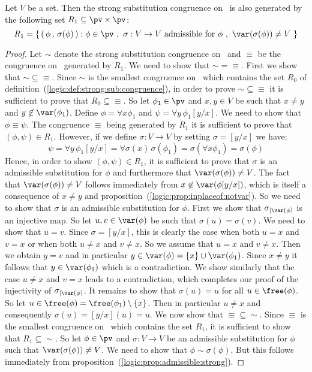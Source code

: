 \begin{prop}\label{logic:prop:strong:quant:congruence:from:admissible}
Let $V$ be a set. Then the strong substitution congruence on \pv\ is
also generated by the following set $R_{1}\subseteq \pv\times\pv$:
    \[
    R_{1}=\left\{\,(\,\phi\,,\,\sigma(\phi)\,):\phi\in\pv\ ,\
    \mbox{$\sigma:V\to V$ admissible for $\phi$}\ ,\
    \var(\sigma(\phi))\neq V\ \right\}
    \]
\end{prop}
\begin{proof}
Let $\sim$ denote the strong substitution congruence on \pv\ and
$\equiv$ be the congruence on \pv\ generated by $R_{1}$. We need to
show that $\sim=\equiv$. First we show that $\sim\subseteq\equiv$.
Since $\sim$ is the smallest congruence on \pv\ which contains the
set $R_{0}$ of definition~(\ref{logic:def:strong:sub:congruence}),
in order to prove $\sim\subseteq\equiv$ it is sufficient to prove
that $R_{0}\subseteq\equiv$. So let $\phi_{1}\in\pv$ and $x,y\in V$
be such that $x\neq y$ and $y\not\in\var(\phi_{1})$. Define
$\phi=\forall x\phi_{1}$ and $\psi=\forall y\,\phi_{1}[y/x]$. We
need to show that $\phi\equiv\psi$. The congruence $\equiv$ being
generated by $R_{1}$ it is sufficient to prove that $(\phi,\psi)\in
R_{1}$. However, if we define $\sigma:V\to V$ by setting
$\sigma=[y/x]$ we have:
    \[
    \psi=\forall
    y\,\phi_{1}[y/x]=\forall\sigma(x)\,\sigma(\phi_{1})=\sigma(\forall
    x\phi_{1})=\sigma(\phi)
    \]
Hence, in order to show $(\phi,\psi)\in R_{1}$, it is sufficient to
prove that $\sigma$ is an admissible substitution for $\phi$ and
furthermore that $\var(\sigma(\phi))\neq V$. The fact that
$\var(\sigma(\phi))\neq V$ follows immediately from
$x\not\in\var(\phi[y/x])$, which is itself a consequence of $x\neq
y$ and proposition~(\ref{logic:prop:inplaceof:notvar}). So we need
to show that $\sigma$ is an admissible substitution for $\phi$.
First we show that $\sigma_{|\var(\phi)}$ is an injective map. So
let $u,v\in\var(\phi)$ be such that $\sigma(u)=\sigma(v)$. We need
to show that $u=v$. Since $\sigma=[y/x]$, this is clearly the case
when both $u=x$ and $v=x$ or when both $u\neq x$ and $v\neq x$. So
we assume that $u=x$ and $v\neq x$. Then we obtain $y=v$ and in
particular $y\in\var(\phi)=\{x\}\cup\var(\phi_{1})$. Since $x\neq y$
it follows that $y\in\var(\phi_{1})$ which is a contradiction. We
show similarly that the case $u\neq x$ and $v=x$ leads to a
contradiction, which completes our proof of the injectivity of
$\sigma_{|\var(\phi)}$. It remains to show that $\sigma(u)=u$ for
all $u\in\free(\phi)$. So let
$u\in\free(\phi)=\free(\phi_{1})\setminus\{x\}$. Then in particular
$u\neq x$ and consequently $\sigma(u)=[y/x](u)=u$. We now show that
$\equiv\subseteq\sim$. Since $\equiv$ is the smallest congruence on
\pv\ which contains the set $R_{1}$, it is sufficient to show that
$R_{1}\subseteq\sim$. So let $\phi\in\pv$ and $\sigma:V\to V$ be an
admissible substitution for $\phi$ such that $\var(\sigma(\phi))\neq
V$. We need to show that $\phi\sim\sigma(\phi)$. But this follows
immediately from proposition~(\ref{logic:prop:admissible:strong}).
\end{proof}
